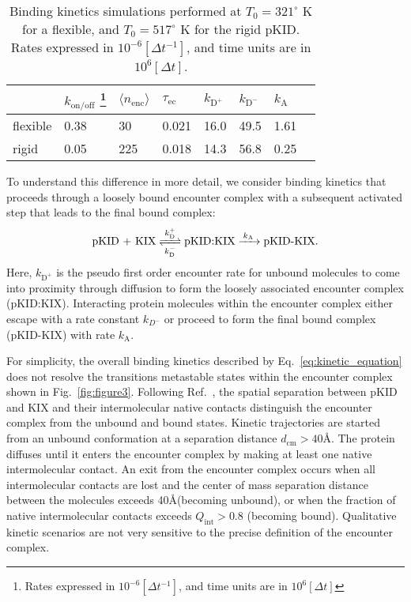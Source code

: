 \documentclass[../talant.diss.submit.tex]{subfiles}
\begin{document}
\begin{table}[t]
  \centering
  \begin{tabular}{@{}llllllll@{}}
    &$k_\mathrm{on/off}$
    \footnote{Rates expressed in $10^{-6} [\Delta t^{-1}]$, and time units are in $10^{6} [\Delta t]$}
    & $\langle n_{\mathrm{enc}}\rangle$
    & $\tau_{\mathrm{ec}}$ 
    & $k_{\mathrm{D}^{+}}$
    & $k_{\mathrm{D}^{-}}$
    & $k_{\mathrm{A}}$\\
    \hline
    flexible & 0.38  & 30  &  0.021 & 16.0  &  49.5  &  1.61   \\
    rigid    & 0.05  & 225 &  0.018 & 14.3  &  56.8  &  0.25   \\
  \end{tabular}
  \caption{Binding kinetics simulations performed at $T_0=321^\circ$ K for a flexible, and $T_0=517^\circ$ K for
    the rigid pKID. Rates expressed in $10^{-6} [\Delta t^{-1}]$, and time units are in $10^{6} [\Delta t]$.}
  \label{tab:kinetics}
\end{table}


To understand this difference in more detail, we consider binding kinetics
that proceeds through a loosely bound encounter complex with
a subsequent activated step that leads to the final bound complex:\cite{sugase:07,huang:09}
\begin{equation}
  \label{eq:kinetic_equation}
  \ce{
    \mbox{pKID + KIX} <=>[$k_\mathrm{D}^{+}$][$k_\mathrm{D}^{-}$] \mbox{pKID:KIX}
    ->[$k_\mathrm{A}$] \mbox{pKID-KIX}
  }.
\end{equation}
Here, $k_{\mathrm{D}^+}$ is the pseudo first order encounter rate for unbound
molecules to come into proximity through diffusion to form the loosely
associated encounter complex (pKID:KIX). Interacting protein molecules within
the encounter complex either escape with a rate constant $k_{D^{-}}$ or proceed
to form the final bound complex (pKID-KIX) with rate $k_\mathrm{A}$.

For simplicity, the overall binding kinetics described by
Eq.~\ref{eq:kinetic_equation} does not resolve the transitions metastable states
within the encounter complex shown in Fig.~\ref{fig:figure3}.  Following
Ref.~\cite{huang:09},%
the spatial separation between pKID and KIX and
their intermolecular native contacts distinguish the encounter complex from the
unbound and bound states. Kinetic trajectories are started from an unbound
conformation at a separation distance $d_\mathrm{cm} > 40$\AA.  The protein
diffuses until it enters the encounter complex by making at least one native
intermolecular contact. An exit from the encounter complex occurs when all
intermolecular contacts are lost and the center of mass separation distance
between the molecules exceeds 40\AA (becoming unbound), or when the fraction of
native intermolecular contacts exceeds $Q_\mathrm{int} > 0.8$ (becoming bound).
Qualitative kinetic scenarios are not very sensitive to the precise definition
of the encounter complex.
\end{document}
